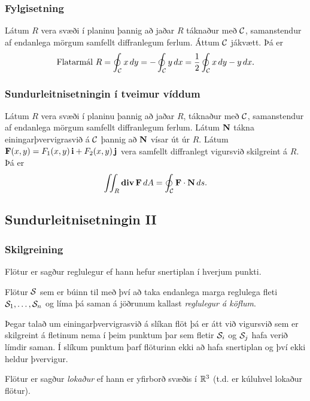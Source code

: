 \subsubsection{Fylgisetning \rtask{}}
 Látum $R$ vera svæði í planinu þannig að
jaðar $R$ táknaður með $\cal C$, 
samanstendur af endanlega mörgum samfellt diffranlegum
ferlum.  Áttum $\cal C$ jákvætt. 
Þá er 
$$\mbox{Flatarmál } R=\oint_{\cal C}x\,dy= 
-\oint_{\cal C}y\,dx=\frac{1}{2}\oint_{\cal C}x\,dy-y\,dx.$$


\subsubsection{Sundurleitnisetningin í tveimur víddum \rtask{}}

Látum $R$ vera svæði í planinu þannig að
jaðar $R$, táknaður með $\cal C$,  
samanstendur af endanlega mörgum samfellt diffranlegum
ferlum.  Látum $\mbox{${\bf N}$}$ tákna einingarþvervigrasvið á $\cal C$ þannig að
$\mbox{${\bf N}$}$ vísar út úr $R$.  Látum
$\mbox{${\bf F}$}(x,y)=F_1(x,y)\,\mbox{${\bf i}$}+F_2(x,y)\,\mbox{${\bf j}$}$ vera samfellt diffranlegt
vigursvið skilgreint á $R$.  Þá er 
$$\int\!\!\!\int_R\mbox{${\rm\bf div\,}$} \mbox{${\bf F}$}\,dA=\oint_{\cal C} \mbox{${\bf F}$}\cdot\mbox{${\bf N}$}\,ds.$$



\subsection{Sundurleitnisetningin II} 

\subsubsection{Skilgreining \rtask{}}
 Flötur er sagður reglulegur ef hann hefur snertiplan í hverjum punkti.  

Flötur $\cal S$ sem er búinn til með því að taka endanlega marga reglulega fleti ${\cal S}_1, \ldots, {\cal S}_n$ og líma þá saman á jöðrunum kallast {\em reglulegur á köflum}. 

\medskip
Þegar talað um einingarþvervigrasvið á slíkan flöt þá er átt við
vigursvið sem er skilgreint á fletinum nema í þeim punktum þar sem
fletir ${\cal S}_i$ og  ${\cal S}_j$ hafa verið límdir saman.  Í
slíkum punktum þarf flöturinn ekki að hafa snertiplan og því ekki
heldur þvervigur.

\medskip
Flötur er sagður {\em lokaður} ef hann er yfirborð svæðis í ${\mathbb R}^3$
(t.d. er kúluhvel lokaður flötur).



